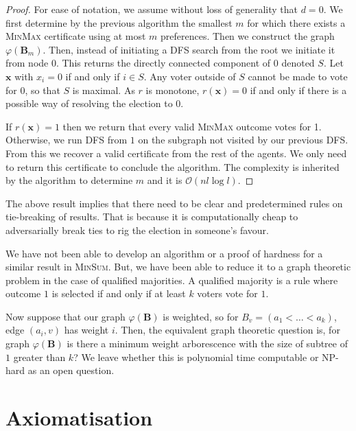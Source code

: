 \documentclass[11pt,a4paper, titlepage]{article}
\theoremstyle{definition}
\let\vec\mathbf
\begin{document}
\begin{proof}

    For ease of notation, we assume without loss of generality that $d = 0$.
    We first determine by the previous algorithm the smallest $m$ for which there exists a \textsc{MinMax} certificate using at most $m$ preferences.
    Then we construct the graph $\varphi(\vec{B}_m)$.
    Then, instead of initiating a DFS search from the root we initiate it from node $0$.
    This returns the directly connected component of $0$ denoted $S$.
    Let $\vec{x}$ with $x_i = 0$ if and only if $i \in S$.
    Any voter outside of $S$  cannot be made to vote for $0$, so that $S$ is maximal. As $r$ is monotone, $r(\vec{x}) = 0$ if and only if  there is a possible way of resolving the election to $0$.

    If $r(\vec{x}) = 1$ then we return that every valid \textsc{MinMax} outcome votes for 1.
    Otherwise, we run DFS from $1$ on the subgraph not visited by our previous DFS.
    From this we recover a valid certificate from the rest of the agents.
    We only need to return this certificate to conclude the algorithm.
    The complexity is inherited by the algorithm to determine $m$ and it is $\mathcal{O}(nl \log l)$.
\end{proof}

The above result implies that there need to be clear and predetermined rules on tie-breaking of results.
That is because it is computationally cheap to adversarially break ties to rig the election in someone's favour.

We have not been able to develop an algorithm or a proof of hardness for a similar result in \textsc{MinSum}.
But, we have been able to reduce it to a graph theoretic problem in the case of qualified majorities.
A qualified majority is a rule where outcome $1$ is selected if and only if at least $k$ voters vote for $1$.

Now suppose that our graph $\varphi(\vec{B})$ is weighted, so for $B_v = (a_1 < \ldots < a_k)$, edge $(a_i, v)$ has weight $i$. 
Then, the equivalent graph theoretic question is, for graph $\varphi(\vec{B})$ is there a minimum weight arborescence with the size of subtree of $1$ greater than $k$? 
We leave whether this is polynomial time computable or NP-hard as an open question.

\newpage
\section{Axiomatisation}
\label{section:axioms}
\end{document}
